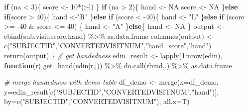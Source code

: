 \documentclass[
]{article}
\newenvironment{Shaded}{\begin{snugshade}}{\end{snugshade}}
\newcommand{\AttributeTok}[1]{\textcolor[rgb]{0.77,0.63,0.00}{#1}}
\newcommand{\CommentTok}[1]{\textcolor[rgb]{0.56,0.35,0.01}{\textit{#1}}}
\newcommand{\ConstantTok}[1]{\textcolor[rgb]{0.00,0.00,0.00}{#1}}
\newcommand{\ControlFlowTok}[1]{\textcolor[rgb]{0.13,0.29,0.53}{\textbf{#1}}}
\newcommand{\DecValTok}[1]{\textcolor[rgb]{0.00,0.00,0.81}{#1}}
\newcommand{\FunctionTok}[1]{\textcolor[rgb]{0.00,0.00,0.00}{#1}}
\newcommand{\NormalTok}[1]{#1}
\newcommand{\OtherTok}[1]{\textcolor[rgb]{0.56,0.35,0.01}{#1}}
\newcommand{\SpecialCharTok}[1]{\textcolor[rgb]{0.00,0.00,0.00}{#1}}
\newcommand{\StringTok}[1]{\textcolor[rgb]{0.31,0.60,0.02}{#1}}
\begin{document}
\begin{Shaded}
\begin{Highlighting}[]
  \ControlFlowTok{if}\NormalTok{ (na }\SpecialCharTok{\textless{}} \DecValTok{3}\NormalTok{)\{}
\NormalTok{    score }\OtherTok{\textless{}{-}} \DecValTok{10}\SpecialCharTok{*}\NormalTok{(r}\SpecialCharTok{{-}}\NormalTok{l)}
\NormalTok{  \}}
  \ControlFlowTok{if}\NormalTok{ (na }\SpecialCharTok{\textgreater{}} \DecValTok{2}\NormalTok{)\{}
\NormalTok{    hand }\OtherTok{\textless{}{-}} \ConstantTok{NA}
\NormalTok{    score }\OtherTok{\textless{}{-}} \ConstantTok{NA}
\NormalTok{  \}}\ControlFlowTok{else} \ControlFlowTok{if}\NormalTok{(score }\SpecialCharTok{\textgreater{}} \DecValTok{40}\NormalTok{)\{}
\NormalTok{    hand }\OtherTok{\textless{}{-}}\StringTok{"R"}
\NormalTok{  \}}\ControlFlowTok{else} \ControlFlowTok{if}\NormalTok{ (score }\SpecialCharTok{\textless{}} \SpecialCharTok{{-}}\DecValTok{40}\NormalTok{)\{}
\NormalTok{    hand }\OtherTok{\textless{}{-}} \StringTok{"L"}
\NormalTok{  \}}\ControlFlowTok{else} \ControlFlowTok{if}\NormalTok{ (score }\SpecialCharTok{\textgreater{}=} \SpecialCharTok{{-}}\DecValTok{40} \SpecialCharTok{\&}\NormalTok{ score }\SpecialCharTok{\textless{}=} \DecValTok{40}\NormalTok{) \{}
\NormalTok{    hand }\OtherTok{\textless{}{-}} \StringTok{"A"}
\NormalTok{  \}}\ControlFlowTok{else}\NormalTok{\{}
\NormalTok{    hand }\OtherTok{\textless{}{-}} \ConstantTok{NA}
\NormalTok{  \}}
\NormalTok{  output }\OtherTok{\textless{}{-}} \FunctionTok{cbind}\NormalTok{(sub,visit,score,hand) }\SpecialCharTok{\%\textgreater{}\%}\NormalTok{ as.data.frame}
  \FunctionTok{colnames}\NormalTok{(output) }\OtherTok{\textless{}{-}} \FunctionTok{c}\NormalTok{(}\StringTok{"SUBJECTID"}\NormalTok{,}\StringTok{"CONVERTEDVISITNUM"}\NormalTok{,}\StringTok{"hand\_score"}\NormalTok{,}\StringTok{"hand"}\NormalTok{)}
  \FunctionTok{return}\NormalTok{(output)}
\NormalTok{\}}
\CommentTok{\# get handedness}
\NormalTok{edin\_result }\OtherTok{\textless{}{-}} \FunctionTok{lapply}\NormalTok{(}\DecValTok{1}\SpecialCharTok{:}\FunctionTok{nrow}\NormalTok{(edin), }\ControlFlowTok{function}\NormalTok{(r) }\FunctionTok{get\_hand}\NormalTok{(edin[r,])) }\SpecialCharTok{\%\textgreater{}\%} \FunctionTok{do.call}\NormalTok{(rbind,.) }\SpecialCharTok{\%\textgreater{}\%}\NormalTok{ as.data.frame}

\CommentTok{\# merge handedness with demo table}
\NormalTok{df\_demo }\OtherTok{\textless{}{-}} \FunctionTok{merge}\NormalTok{(}\AttributeTok{x=}\NormalTok{df\_demo, }\AttributeTok{y=}\NormalTok{edin\_result[}\FunctionTok{c}\NormalTok{(}\StringTok{"SUBJECTID"}\NormalTok{,}\StringTok{"CONVERTEDVISITNUM"}\NormalTok{,}\StringTok{"hand"}\NormalTok{)], }\AttributeTok{by=}\FunctionTok{c}\NormalTok{(}\StringTok{"SUBJECTID"}\NormalTok{,}\StringTok{"CONVERTEDVISITNUM"}\NormalTok{), }\AttributeTok{all.x=}\NormalTok{T)}


\end{Highlighting}
\end{Shaded}
\end{document}
